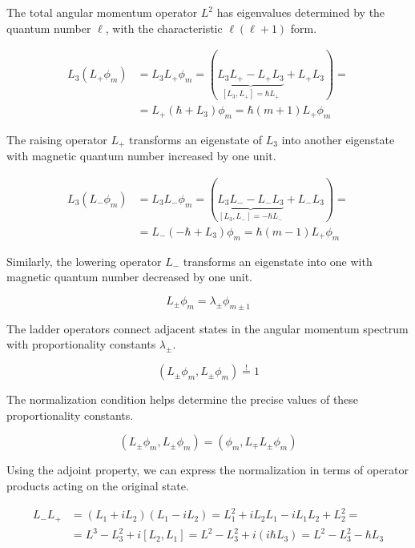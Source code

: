 \documentclass[italian]{HKNdocument}
\begin{document}
The total angular momentum operator $L^2$ has eigenvalues determined by the quantum number $\ell$, with the characteristic $\ell(\ell+1)$ form.

\begin{align}
L_{3}\left(L_{+} \phi_{m}\right) & =L_{3} L_{+} \phi_{m}=(\underbrace{L_{3} L_{+}-L_{+} L_{3}}_{\left[L_{3}, L_{+}\right]=\hbar L_{+}}+L_{+} L_{3})=  \\
& =L_{+}\left(\hbar+L_{3}\right) \phi_{m}=\hbar(m+1) L_{+} \phi_{m}
\end{align}

The raising operator $L_+$ transforms an eigenstate of $L_3$ into another eigenstate with magnetic quantum number increased by one unit.

\begin{align}
L_{3}\left(L_{-} \phi_{m}\right) & =L_{3} L_{-} \phi_{m}=(\underbrace{L_{3} L_{-}-L_{-} L_{3}}_{\left[L_{3}, L_{-}\right]=-\hbar L_{-}}+L_{-} L_{3})=  \\
& =L_{-}\left(-\hbar+L_{3}\right) \phi_{m}=\hbar(m-1) L_{+} \phi_{m}
\end{align}

Similarly, the lowering operator $L_-$ transforms an eigenstate into one with magnetic quantum number decreased by one unit.

\begin{equation}
L_{ \pm} \phi_{m}=\lambda_{ \pm} \phi_{m \pm 1}
\end{equation}

The ladder operators connect adjacent states in the angular momentum spectrum with proportionality constants $\lambda_\pm$.

\begin{equation}
\left(L_{ \pm} \phi_{m}, L_{ \pm} \phi_{m}\right) \stackrel{!}{=} 1
\end{equation}

The normalization condition helps determine the precise values of these proportionality constants.

\begin{equation}
\left(L_{ \pm} \phi_{m}, L_{ \pm} \phi_{m}\right)=\left(\phi_{m}, L_{\mp} L_{ \pm} \phi_{m}\right)
\end{equation}

Using the adjoint property, we can express the normalization in terms of operator products acting on the original state.

\begin{align}
L_{-} L_{+} & =\left(L_{1}+i L_{2}\right)\left(L_{1}-i L_{2}\right)=L_{1}^{2}+i L_{2} L_{1}-i L_{1} L_{2}+L_{2}^{2}= \\
& =L^{3}-L_{3}^{2}+i\left[L_{2}, L_{1}\right]=L^{2}-L_{3}^{2}+i\left(i \hbar L_{3}\right)=L^{2}-L_{3}^{2}-\hbar L_{3}
\end{align}
\end{document}

